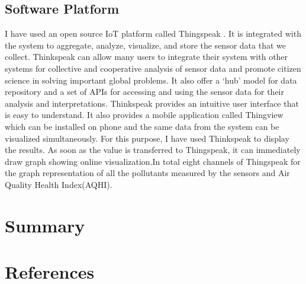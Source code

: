 \documentclass[10pt,a4paper]{report}
\begin{document}
\section{Software Platform}
 I have used an open source IoT platform called Thingspeak \cite{Thingspeak}. It is integrated with the system to aggregate, analyze, visualize, and store the sensor data that we collect\cite{Thingspeak}. Thinkspeak can allow many users to integrate their system with other systems for collective and cooperative analysis of sensor data and promote citizen science in solving important global problems. It also offer a ‘hub’ model for data repository and a set of APIs for accessing and using the sensor data for their analysis and interpretations. Thinkspeak provides an intuitive user interface that is easy to understand. It also provides a mobile application called Thingview which can be installed on phone and the same data from the system can be visualized simultaneously.
For this purpose, I have used Thinkspeak to display the results. As soon as the value is transferred to Thingspeak, it can immediately draw graph showing online visualization.In total eight channels of Thingspeak for the graph representation of all the pollutants measured by the sensors and Air Quality Health Index(AQHI).




\chapter{Summary}

\chapter*{References}
\end{document}
